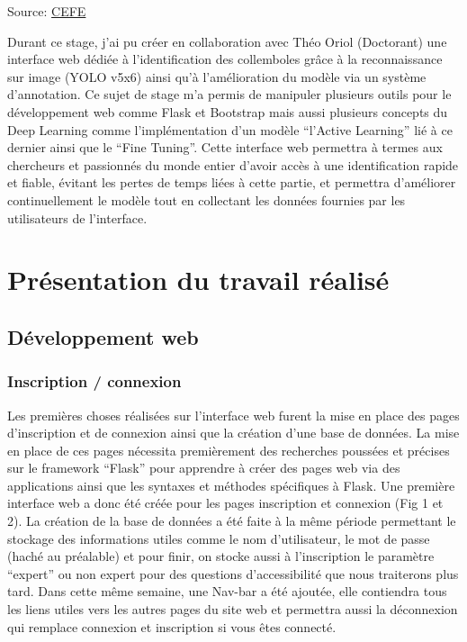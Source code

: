 \documentclass[
  10pt,
]{article}
\begin{document}
Source: \href{https://www.cefe.cnrs.fr/fr/}{CEFE}

Durant ce stage, j'ai pu créer en collaboration avec Théo Oriol
(Doctorant) une interface web dédiée à l'identification des collemboles
grâce à la reconnaissance sur image (YOLO v5x6) ainsi qu'à
l'amélioration du modèle via un système d'annotation. Ce sujet de stage
m'a permis de manipuler plusieurs outils pour le développement web comme
Flask et Bootstrap mais aussi plusieurs concepts du Deep Learning comme
l'implémentation d'un modèle ``l'Active Learning'' lié à ce dernier
ainsi que le ``Fine Tuning''. Cette interface web permettra à termes aux
chercheurs et passionnés du monde entier d'avoir accès à une
identification rapide et fiable, évitant les pertes de temps liées à
cette partie, et permettra d'améliorer continuellement le modèle tout en
collectant les données fournies par les utilisateurs de l'interface.

\newpage

\section{Présentation du travail
réalisé}\label{pruxe9sentation-du-travail-ruxe9alisuxe9}

\subsection{Développement web}\label{duxe9veloppement-web}

\subsubsection{Inscription / connexion}\label{inscription-connexion}

Les premières choses réalisées sur l'interface web furent la mise en
place des pages d'inscription et de connexion ainsi que la création
d'une base de données. La mise en place de ces pages nécessita
premièrement des recherches poussées et précises sur le framework
``Flask'' pour apprendre à créer des pages web via des applications
ainsi que les syntaxes et méthodes spécifiques à Flask. Une première
interface web a donc été créée pour les pages inscription et connexion
(Fig 1 et 2). La création de la base de données a été faite à la même
période permettant le stockage des informations utiles comme le nom
d'utilisateur, le mot de passe (haché au préalable) et pour finir, on
stocke aussi à l'inscription le paramètre ``expert'' ou non expert pour
des questions d'accessibilité que nous traiterons plus tard. Dans cette
même semaine, une Nav-bar a été ajoutée, elle contiendra tous les liens
utiles vers les autres pages du site web et permettra aussi la
déconnexion qui remplace connexion et inscription si vous êtes connecté.
\end{document}
